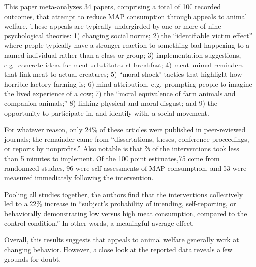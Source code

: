\documentclass[
  letterpaper,
  DIV=11,
  numbers=noendperiod]{scrartcl}
\begin{document}
This paper meta-analyzes 34 papers, comprising a total of 100 recorded
outcomes, that attempt to reduce MAP consumption through appeals to
animal welfare. These appeals are typically undergirded by one or more
of nine psychological theories: 1) changing social norms; 2) the
``identifiable victim effect'' where people typically have a stronger
reaction to something bad happening to a named individual rather than a
class or group; 3) implementation suggestions, e.g.~concrete ideas for
meat substitutes at breakfast; 4) meat-animal reminders that link meat
to actual creatures; 5) ``moral shock'' tactics that highlight how
horrible factory farming is; 6) mind attribution, e.g.~prompting people
to imagine the lived experience of a cow; 7) the ``moral equivalence of
farm animals and companion animals;'' 8) linking physical and moral
disgust; and 9) the opportunity to participate in, and identify with, a
social movement.

For whatever reason, only 24\% of these articles were published in
peer-reviewed journals; the remainder came from ``dissertations, theses,
conference proceedings, or reports by nonprofits.'' Also notable is that
⅔ of the interventions took less than 5 minutes to implement. Of the 100
point estimates,75 come from randomized studies, 96 were
self-assessments of MAP consumption, and 53 were measured immediately
following the intervention.

Pooling all studies together, the authors find that the interventions
collectively led to a 22\% increase in ``subject's probability of
intending, self-reporting, or behaviorally demonstrating low versus high
meat consumption, compared to the control condition.'' In other words, a
meaningful average effect.

Overall, this results suggests that appeals to animal welfare generally
work at changing behavior. However, a close look at the reported data
reveals a few grounds for doubt.
\end{document}
